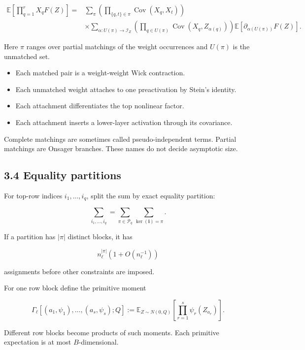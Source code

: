 \[
\begin{aligned}
\mathbb E\left[\prod_{q=1}^rX_qF(Z)\right]
={}&
\sum_{\pi}
\left(
\prod_{\{q,t\}\in\pi}
\operatorname{Cov}(X_q,X_t)
\right)
\\
&\times
\sum_{\alpha:U(\pi)\to\mathcal I_Z}
\left(
\prod_{q\in U(\pi)}
\operatorname{Cov}(X_q,Z_{\alpha(q)})
\right)
\mathbb E[
\partial_{\alpha(U(\pi))}F(Z)].
\end{aligned}
\]


Here \(\pi\) ranges over partial matchings of the weight occurrences and
\(U(\pi)\) is the unmatched set.

\begin{itemize}
\item Each matched pair is a weight-weight Wick contraction.
\item Each unmatched weight attaches to one preactivation by Stein's identity.
\item Each attachment differentiates the top nonlinear factor.
\item Each attachment inserts a lower-layer activation through its covariance.
\end{itemize}


Complete matchings are sometimes called pseudo-independent terms. Partial
matchings are Onsager branches. These names do not decide asymptotic size.

\subsection*{3.4 Equality partitions}


For top-row indices \(i_1,\ldots,i_q\), split the sum by exact equality
partition:

\[
\sum_{i_1,\ldots,i_q}
=
\sum_{\pi\in\mathcal P_q}
\sum_{\ker(\boldsymbol i)=\pi}.
\]


If a partition has \(|\pi|\) distinct blocks, it has

\[
n_\ell^{|\pi|}(1+O(n_\ell^{-1}))
\]


assignments before other constraints are imposed.

For one row block define the primitive moment

\[
\Gamma_\ell
[(a_1,\psi_1),\ldots,(a_s,\psi_s);Q]
:=
\mathbb E_{Z\sim N(0,Q)}
\left[\prod_{r=1}^s\psi_r(Z_{a_r})\right].
\]


Different row blocks become products of such moments. Each primitive
expectation is at most \(B\)-dimensional.

